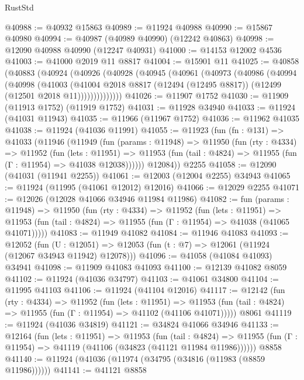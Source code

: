 \begin{lexlean}{RustStd}
\begin{coremodule}
{\begin{coremodule}
{{{{{{{{{{{{{{{{{{{{{{{{{{{{{{{{{{{{{{{{{{{{{{{{{{{{{{{{{{{{{{{{{{{{{{{{{{{{{{{{@40988 := @40932 @15863
@40989 := @11924 @40988
@40990 := @15867 @40980
@40994 := @40987 (@40989 @40990) (@12242 @40863)
@40998 := @12090 @40988 @40990 (@12247 @40931)
@41000 := @14153 @12002 @4536
@41003 := @41000 @2019 @11 @8817
@41004 := @15901 @11
@41025 := @40858
    (@40883
      (@40924
        (@40926
          (@40928
            (@40945
              (@40961
                (@40973
                  (@40986
                    (@40994
                      (@40998
                        (@41003
                          (@41004
                            @2018
                            @8817
                            (@12494 (@12495 @8817))
                            (@12499 (@12501 @2018 @11))))))))))))))
@41026 := @11907 @1752
@41030 := @11909 (@11913 @1752) (@11919 @1752)
@41031 := @11928 @34940
@41033 := @11924 (@41031 @11943)
@41035 := @11966 (@11967 @1752)
@41036 := @11962 @41035
@41038 := @11924 (@41036 @11991)
@41055 := @11923
    (fun (fn : @131) =>
    @41033
      (@11946
        (@11949
          (fun (params : @11948) =>
          @11950
            (fun (rty : @4334) =>
            @11952
              (fun (lets : @11951) =>
              @11953 (fun (tail : @4824) => @11955 (fun (Γ : @11954) => @41038 @12038))))))
        @12084))
    @2255
@41058 := @12090 (@41031 (@11941 @2255))
@41061 := @12003 (@12004 @2255) @34943
@41065 := @11924 (@11995 (@41061 @12012) @12016)
@41066 := @12029 @2255
@41071 := @12026 (@12028 @41066 @34946 @11984 @11986)
@41082 := fun (params : @11948) =>
  @11950
    (fun (rty : @4334) =>
    @11952
      (fun (lets : @11951) =>
      @11953 (fun (tail : @4824) => @11955 (fun (Γ : @11954) => @41038 (@41065 @41071)))))
@41083 := @11949 @41082
@41084 := @11946 @41083
@41093 := @12052
    (fun (U : @12051) => @12053 (fun (t : @7) => @12061 (@11924 (@12067 @34943 @11942) @12078)))
@41096 := @41058 (@41084 @41093) @34941
@41098 := @11909 @41083 @41093
@41100 := @12139 @41082 @8059
@41102 := @11924 (@41036 @34797)
@41103 := @41061 @34800
@41104 := @11995 @41103
@41106 := @11924 (@41104 @12016)
@41117 := @12142
    (fun (rty : @4334) =>
    @11952
      (fun (lets : @11951) =>
      @11953 (fun (tail : @4824) => @11955 (fun (Γ : @11954) => @41102 (@41106 @41071)))))
    @8061
@41119 := @11924 (@41036 @34819)
@41121 := @34824 @41066 @34946
@41133 := @12164
    (fun (lets : @11951) =>
    @11953
      (fun (tail : @4824) =>
      @11955 (fun (Γ : @11954) => @41119 (@41106 (@34823 (@41121 @11984 @11986))))))
    @8858
@41140 := @11924 (@41036 (@11974 (@34795 (@34816 (@11983 (@8859 @11986))))))
@41141 := @41121 @8858
}}}}}}}}}}}}}}}}}}}}}}}}}}}}}}}}}}}}}}}}}}}}}}}}}}}}}}}}}}}}}}}}}}}}}}}}}}}}}}}}
\end{coremodule}}
\end{coremodule}
\end{lexlean}
